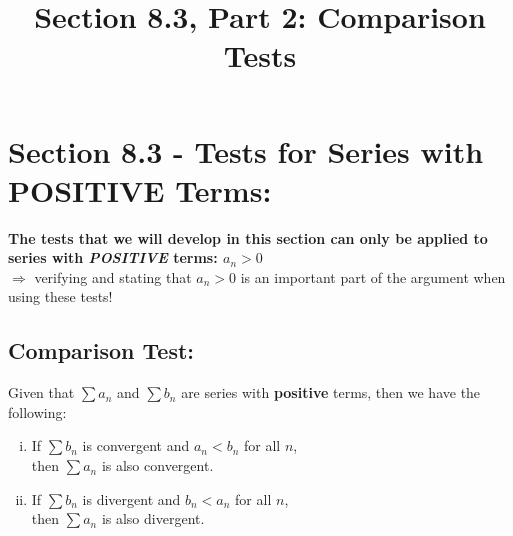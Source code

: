 \documentclass[10pt]{article}
\begin{document}
\newcommand{\an}{\lbrace a_n \rbrace}
\newcommand{\Sum}{\displaystyle \sum_{n=1}^\infty }

\everymath{\displaystyle}
\renewcommand{\myTitle}{	MATH 1336: Calculus III}

\renewcommand{\mySubTitle}{Section 8.3, Part 2: Comparison Tests}%


\title{\mySubTitle}\date{}
\maketitle

\hspace*{-.8in}%

\setlength{\columnseprule}{.4pt}
\setlength{\columnsep}{3em}

\section*{Section 8.3 - Tests for Series with POSITIVE Terms: }
\textbf{The tests that we will develop in this section can only be applied to series with \textit{POSITIVE} terms: \(a_n >0\)}\\
\(\Rightarrow\)  verifying and stating that \(a_n >0\) is an important part of the argument when using these tests!\\
\vspace*{.1in}



\subsection*{Comparison Test:}
Given that \(\sum a_n\) and \(\sum b_n\) are series with \textbf{positive} terms, then we have the following:
\begin{enumerate}[(i)]
\item If \(\sum b_n\) is convergent and \(a_n < b_n\) for all \(n\),\\ then \(\sum a_n\) is also convergent.
\item If \(\sum b_n\) is divergent and \(b_n < a_n\) for all \(n\),\\ then \(\sum a_n\) is also divergent.
\end{enumerate}
\end{document}
